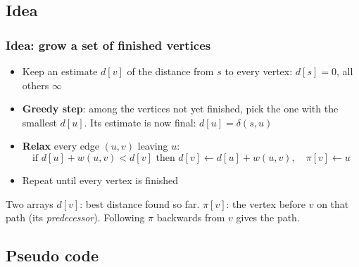 \documentclass[aspectratio=169,10pt,compress]{beamer}
\begin{document}

\subsection[Idea]{Idea}




\begin{frame}[t,fragile] \frametitle{Idea: grow a set of finished vertices}
  \begin{itemize}
    \item Keep an estimate $d[v]$ of the distance from $s$ to every vertex: $d[s] = 0$, all others $\infty$
    \item \textbf{Greedy step}: among the vertices not yet finished, pick the one with the smallest $d[u]$.
          Its estimate is now final: $d[u] = \delta(s, u)$
    \item \textbf{Relax} every edge $(u, v)$ leaving $u$:
          \[
          	\text{if } d[u] + w(u, v) < d[v] \text{ then } d[v] \leftarrow d[u] + w(u, v), \quad \pi[v] \leftarrow u
          \]
    \item Repeat until every vertex is finished
  \end{itemize}

  \vspace{0.4em}
  \begin{block}{Two arrays}
    \small $d[v]$: best distance found so far. \quad
    $\pi[v]$: the vertex before $v$ on that path (its \emph{predecessor}).
    Following $\pi$ backwards from $v$ gives the path.
  \end{block}
\end{frame}

\subsection[Pseudo code]{Pseudo code}
\end{document}
